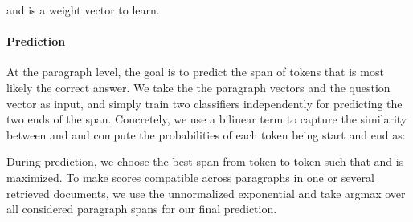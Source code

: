\documentclass[11pt,a4paper]{article}
\begin{document}
and  is a weight vector to learn.

\paragraph{\textbf{Prediction}} At the paragraph level, the goal is to predict the span of tokens that is most likely the correct answer. We take the
the paragraph vectors  and the question vector  as input, and simply train two classifiers independently for predicting the two ends of the span. Concretely, we use a bilinear term to capture the similarity between  and  and compute the probabilities of each token being start and end as:

During prediction, we choose the best span from token  to token  such that  and  is maximized.
To make scores compatible across paragraphs in one or several retrieved documents, we use the unnormalized exponential and take argmax over all considered paragraph spans for our final prediction.
\end{document}

